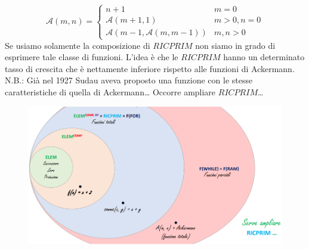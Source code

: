 \documentclass{article}
\begin{document}
\[
    \mathcal{A}(m,n)=
    \begin{cases}
        n+1                                 & m=0      \\
        \mathcal{A}(m+1,1)                  & m>0, n=0 \\
        \mathcal{A}(m-1,\mathcal{A}(m,m-1)) & m,n>0
    \end{cases}
\]
Se usiamo solamente la composizione di $RICPRIM$ non siamo in grado di esprimere tale
classe di funzioni. L'idea è che le $RICPRIM$ hanno un determinato tasso di crescita
che è nettamente inferiore rispetto alle funzioni di Ackermann.
N.B.: Già nel 1927 Sudau aveva proposto una funzione con le stesse caratteristiche
di quella di Ackermann\dots
Occorre ampliare $RICPRIM$\dots
\begin{figure}[H]
    \centering
    \includegraphics[scale=0.5]{images/classi_funzioni.png}
\end{figure}
\end{document}
